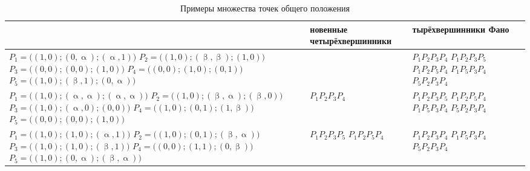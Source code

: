 \begin{table}[H]
\caption{Примеры множества точек общего положения}
\label{tab:my-table}
\begin{tabular}{m{4.5cm}m{2.7cm}m{2.7cm}}
  \toprule
\parbox[c][][c]{0.3\textwidth}{ } & \parbox[c][][c]{0.2\textwidth}{ \-но\-вен\-ные че\-ты\-рёх\-вер\-шин\-ни\-ки} & \parbox[c][][c]{0.2\textwidth}{ \-ты\-рёх\-вер\-шин\-ни\-ки Фано} \\
\midrule
$P_1 = \bigl((1,0);(0,\upalpha);(\upalpha,1)\bigr)$\newline
                $P_2 = \bigl((1,0);(\upbeta,\upbeta);(1,0)\bigr)$\newline
                $P_3 = \bigl((0,0);(0,0);(1,0)\bigr)$\newline
                $P_4 = \bigl((0,0);(1,0);(0,1)\bigr)$\newline
                $P_5 = \bigl((1,0);(\upbeta,1);(0,\upalpha)\bigr)$
      &
      &            $P_1P_2P_3P_4$ \newline
                      $P_1P_2P_3P_5$\newline
                        $P_1P_2P_5P_4$\newline
                        $P_1P_5P_3P_4$\newline
                        $P_5P_2P_3P_4$             \\
\midrule

$P_1 = \bigl((1,0);(\upalpha,\upalpha);(\upalpha,\upalpha)\bigr)$\newline
$P_2 = \bigl((1,0);(\upbeta,\upalpha);(\upbeta,0)\bigr)$\newline
$P_3 = \bigl((1,0);(\upalpha,0);(0,0)\bigr)$\newline
$P_4 = \bigl((1,0);(0,1);(1,\upbeta)\bigr)$\newline
$P_5 = \bigl((0,0);(0,0);(1,0)\bigr)$     &
            $P_1P_2P_3P_4$                   &
                              $P_1P_2P_3P_5$\newline
                              $P_1P_2P_5P_4$\newline
                              $P_1P_5P_3P_4$\newline
                              $P_5P_2P_3P_4$                 \\

\midrule
$P_1 = \bigl((1,0);(1,0);(\upalpha,1)\bigr)$\newline
$P_2 = \bigl((1,0);(0,1);(\upbeta,\upalpha)\bigr)$\newline
$P_3 = \bigl((1,0);(1,0);(\upbeta,1)\bigr)$\newline
$P_4 = \bigl((0,0);(1,1);(0,\upbeta)\bigr)$\newline
$P_5 = \bigl((1,0);(0,\upalpha);(\upbeta,\upalpha)\bigr)$      &
                              $P_1P_2P_3P_5$\newline
                              $P_1P_2P_5P_4$&
                                              $P_1P_2P_3P_4$ \newline
                                              $P_1P_5P_3P_4$\newline
                                              $P_5P_2P_3P_4$\\
\midrule


\end{tabular}
\end{table}
